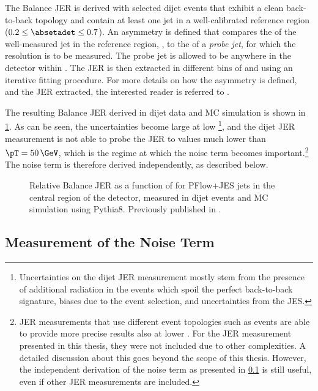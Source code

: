 The Balance JER is derived with selected dijet events that exhibit a clean back-to-back topology and contain at least one jet in a well-calibrated reference region ($0.2 \leq \absetadet \leq 0.7$).
An asymmetry is defined that compares the \pT of the well-measured jet in the reference region, \pTref, to the \pT of a \emph{probe jet}, for which the resolution is to be measured. The probe jet is allowed to be anywhere in the detector within .
The JER is then extracted in different bins of \pTref and \absetadet using an iterative fitting procedure. For more details on how the asymmetry is defined, and the JER extracted, the interested reader is referred to .

The resulting Balance JER derived in dijet data and MC simulation is shown in \cref{fig:insitu-jer-dijet-only}.
As can be seen, the uncertainties become large at low \pT\footnote{Uncertainties on the dijet JER measurement mostly stem from the presence of additional radiation in the events which spoil the perfect back-to-back signature, biases due to the event selection, and uncertainties from the JES.}, and the dijet JER measurement is not able to probe the JER to values much lower than $\pT = 50\,\GeV$, which is the regime at which the noise term becomes important.\footnote{JER measurements that use different event topologies such as \Zjets events are able to provide more precise results also at lower \pT. For the JER measurement presented in this thesis, they were not included due to other complexities. A detailed discussion about this goes beyond the scope of this thesis. However, the independent derivation of the noise term as presented in \cref{sec:noise-term-meas} is still useful, even if other JER measurements are included.}
The noise term is therefore derived independently, as described below.

\FloatBarrier
\begin{figure}[t]
    \caption{Relative Balance JER as a function of \pT for PFlow+JES jets in the central region of the detector, measured in dijet events and MC simulation using Pythia8. Previously published in .}
    \label{fig:insitu-jer-dijet-only}
\end{figure}


\subsection{Measurement of the Noise Term}
\label{sec:noise-term-meas}

